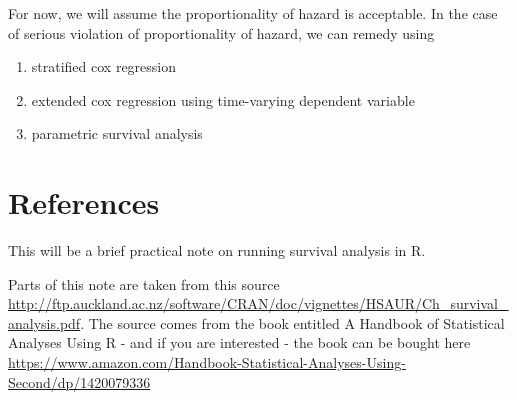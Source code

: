 \documentclass[
]{book}
\providecommand{\tightlist}{%
  \setlength{\itemsep}{0pt}\setlength{\parskip}{0pt}}
\begin{document}
For now, we will assume the proportionality of hazard is acceptable. In the case of serious violation of proportionality of hazard, we can remedy using

\begin{enumerate}
\def\labelenumi{\arabic{enumi}.}
\tightlist
\item
  stratified cox regression
\item
  extended cox regression using time-varying dependent variable
\item
  parametric survival analysis
\end{enumerate}

\hypertarget{references-2}{%
\section{References}\label{references-2}}

This will be a brief practical note on running survival analysis in R.

Parts of this note are taken from this source \url{http://ftp.auckland.ac.nz/software/CRAN/doc/vignettes/HSAUR/Ch_survival_analysis.pdf}. The source comes from the book entitled A Handbook of Statistical Analyses Using R - and if you are interested - the book can be bought here \url{https://www.amazon.com/Handbook-Statistical-Analyses-Using-Second/dp/1420079336}

  

\backmatter
\printindex
\end{document}
